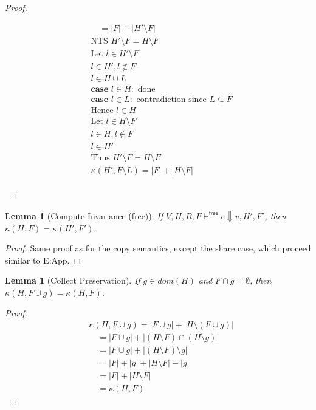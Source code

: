 \documentclass[11pt]{article}
\newtheorem{lemma}[theorem]{Lemma}
\theoremstyle{definition}
\begin{document}
\begin{proof}
\begin{description}
\begin{align*}
		&\quad = |F| + |H' \setminus F| \tag{Set algebra}\\
		&\text{NTS } H' \setminus F = H \setminus F \\
		&\text{Let } l \in H' \setminus F\\
		&l \in H', l \notin F \\
		&l \in H \cup L \tag{Locality of copy}\\
		&\textbf{case } l \in H: \text{ done }\\
		&\textbf{case } l \in L: \text{ contradiction  since } L \subseteq F\\
		&\text{Hence } l \in H\\
		&\text{Let } l \in H \setminus F\\
		&l \in H, l \notin F \\
		&l \in H' \tag{Monotonicity of copy}\\
		&\text{Thus } H' \setminus F = H \setminus F \\
		&\kappa(H',F \setminus L) = |F| + |H \setminus F|\\
	\end{align*}
  \end{description}
\end{proof}

\begin{lemma}[Compute Invariance (free)]
If $V,H,R,F \vdash^{\mathsf{free}} e \Downarrow v,H',F'$, then $\kappa(H,F) = \kappa(H',F')$.
\end{lemma}

\begin{proof}
Same proof as for the copy semantics, except the share case, which proceed similar to E:App.
\end{proof}

\begin{lemma}[Collect Preservation]
If $g \in dom(H)$ and $F \cap g = \emptyset$, then $\kappa(H,F \cup g) = \kappa(H,F)$.
\end{lemma}

\begin{proof}
\begin{align*}
&\kappa(H,F\cup g) = |F \cup g| + |H \setminus (F \cup g)| \tag{Def. compute potential}\\
&\quad = |F \cup g| + |(H \setminus F) \cap (H \setminus g)|\\
&\quad = |F \cup g| + |(H \setminus F) \setminus g|\\
&\quad = |F| + |g| + |H \setminus F| - |g| \tag{$g \in dom(H)$ and $F \cap g = \emptyset$}\\
&\quad = |F| + |H \setminus F|\\
&\quad = \kappa(H,F)
\end{align*}
\end{proof}
\fi
\end{document}

